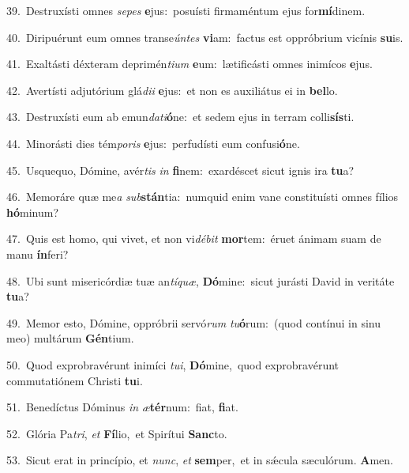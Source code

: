 {\numbfont\textcolor{\numbcolor}{39.}}~Destruxísti omnes \textit{se}\-\textit{pes} \textbf{e}\-jus:~\star posuísti firmaméntum ejus for\-\textbf{mí}\-dinem.\par
{\numbfont\textcolor{\numbcolor}{40.}}~Diripuérunt eum omnes transe\-\textit{ún}\-\textit{tes} \textbf{vi}\-am:~\star factus est oppróbrium vicínis \textbf{su}\-is.\par
{\numbfont\textcolor{\numbcolor}{41.}}~Exaltásti déxteram deprimén\-\textit{ti}\-\textit{um} \textbf{e}\-um:~\star lætificásti omnes inimícos \textbf{e}\-jus.\par
{\numbfont\textcolor{\numbcolor}{42.}}~Avertísti adjutórium glá\-\textit{di}\-\textit{i} \textbf{e}\-jus:~\star et non es auxiliátus ei in \textbf{bel}\-lo.\par
{\numbfont\textcolor{\numbcolor}{43.}}~Destruxísti eum ab emun\-\textit{da}\-\textit{ti}\textbf{ó}ne:~\star et sedem ejus in terram colli\-\textbf{sís}\-ti.\par
{\numbfont\textcolor{\numbcolor}{44.}}~Minorásti dies tém\-\textit{po}\-\textit{ris} \textbf{e}\-jus:~\star perfudísti eum confusi\-\textbf{ó}\-ne.\par
{\numbfont\textcolor{\numbcolor}{45.}}~Usquequo, Dómine, avér\textit{tis} \textit{in} \textbf{fi}\-nem:~\star exardéscet sicut ignis ira \textbf{tu}\-a?\par
{\numbfont\textcolor{\numbcolor}{46.}}~Memoráre quæ me\textit{a} \textit{sub}\-\textbf{stán}tia:~\star numquid enim vane constituísti omnes fílios \textbf{hó}\-minum?\par
{\numbfont\textcolor{\numbcolor}{47.}}~Quis est homo, qui vivet, et non vi\-\textit{dé}\-\textit{bit} \textbf{mor}\-tem:~\star éruet ánimam suam de manu \textbf{ín}\-feri?\par
{\numbfont\textcolor{\numbcolor}{48.}}~Ubi sunt misericórdiæ tuæ an\-\textit{tí}\-\textit{quæ}, \textbf{Dó}\-mine:~\star sicut jurásti David in veritáte \textbf{tu}\-a?\par
{\numbfont\textcolor{\numbcolor}{49.}}~Memor esto, Dómine, oppróbrii servó\textit{rum} \textit{tu}\-\textbf{ó}rum:~\star (quod contínui in sinu meo) multárum \textbf{Gén}\-tium.\par
{\numbfont\textcolor{\numbcolor}{50.}}~Quod exprobravérunt inimíci \textit{tu}\-\textit{i}, \textbf{Dó}\-mine,~\star quod exprobravérunt commutatiónem Christi \textbf{tu}\-i.\par
{\numbfont\textcolor{\numbcolor}{51.}}~Benedíctus Dóminus \textit{in} \textit{æ}\-\textbf{tér}num:~\star fiat, \textbf{fi}\-at.\par
{\numbfont\textcolor{\numbcolor}{52.}}~Glória Pa\-\textit{tri}\-, \textit{et} \textbf{Fí}\-lio,~\star et Spirítui \textbf{Sanc}\-to.\par
{\numbfont\textcolor{\numbcolor}{53.}}~Sicut erat in princípio, et \textit{nunc}\-, \textit{et} \textbf{sem}\-per,~\star et in sǽcula sæculórum. \textbf{A}\-men.\par

